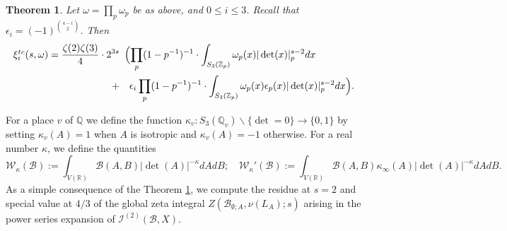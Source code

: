 \documentclass{article}
\def\binom#1#2{{#1\choose#2}}
\def\Z{{\mathbb Z}}
\def\R{{\mathbb R}}
\def\cB{{\mathcal B}}
\def\Q{{\mathbb Q}}
\def\Z{{\mathbb Z}}
\def\Q{{\mathbb Q}}
\def\I{{\mathcal I}}
\newtheorem{theorem}{Theorem}[section]
\begin{document}
\begin{theorem}\label{thm:tczetaformula}
Let $\omega=\prod_p \omega_p$ be as above, and $0\leq i\leq 3$. Recall that $\epsilon_i=(-1)^{\binom{4-i}{2}}$. Then
\begin{equation*}
\begin{array}{rl}
    \xi^{tc}_i(s,\omega)=\displaystyle\frac{\zeta(2)\zeta(3)}{4}\cdot 2^{3s}&\!\!\!
    \displaystyle\Bigl( \prod_{p}(1-p^{-1})^{-1}\cdot\int_{S_3(\Z_p)}\omega_p(x) |\det(x)|_p^{s-2} dx 
\\[.2in]
  +&\displaystyle  \epsilon_i\prod_{p}(1-p^{-1})^{-1}\cdot\int_{S_3(\Z_p)}\omega_p(x)\epsilon_p(x) |\det(x)|_p^{s-2} dx\Bigr).
\end{array}
\end{equation*}
\end{theorem}

For a place $v$ of $\Q$ we define the function $\kappa_v:S_3(\Q_v)\backslash\{\det=0\}\to\{0,1\}$ by setting $\kappa_v(A)=1$ when $A$ is isotropic and $\kappa_v(A)=-1$ otherwise.
For a real number $\kappa$, we define the quantities
\begin{equation*}
\mathcal W_{\kappa}(\cB):=\int_{ V(\R)}\cB(A,B)|\det(A)|^{-\kappa}dAdB;\quad
\mathcal W_{\kappa}'(\cB):=\int_{V(\R)}\cB(A,B)\kappa_\infty(A)|\det(A)|^{-\kappa}dAdB.
\end{equation*}
As a simple consequence of the Theorem \ref{thm:tczetaformula}, we compute the residue at $s=2$ and special value at $4/3$ of the global zeta integral $Z(\cB_{\emptyset;A},\nu(L_A);s)$ arising in the power series expansion of $\I^{(2)}(\cB,X)$. 
\end{document}
